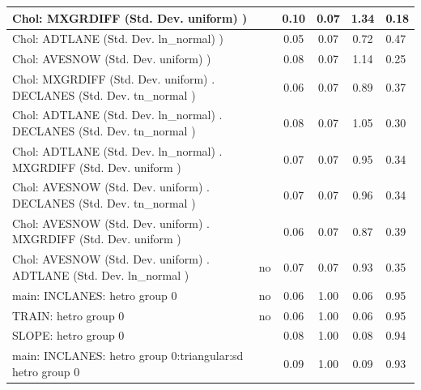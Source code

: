 \begin{table}
\begin{center}
\begin{tabular}{|l|l|c|c|c|l|}
			\hline
			 Chol: MXGRDIFF (Std. Dev. uniform) ) &  & 0.10 & 0.07 & 1.34 & 0.18 \\
			\hline
			 Chol: ADTLANE (Std. Dev. ln_normal) ) &  & 0.05 & 0.07 & 0.72 & 0.47 \\
			\hline
			 Chol: AVESNOW (Std. Dev. uniform) ) &  & 0.08 & 0.07 & 1.14 & 0.25 \\
			\hline
			 Chol: MXGRDIFF (Std. Dev. uniform) . DECLANES (Std. Dev.   tn_normal ) &  & 0.06 & 0.07 & 0.89 & 0.37 \\
			\hline
			 Chol: ADTLANE (Std. Dev. ln_normal) . DECLANES (Std. Dev.   tn_normal ) &  & 0.08 & 0.07 & 1.05 & 0.30 \\
			\hline
			 Chol: ADTLANE (Std. Dev. ln_normal) . MXGRDIFF (Std. Dev.   uniform ) &  & 0.07 & 0.07 & 0.95 & 0.34 \\
			\hline
			 Chol: AVESNOW (Std. Dev. uniform) . DECLANES (Std. Dev.   tn_normal ) &  & 0.07 & 0.07 & 0.96 & 0.34 \\
			\hline
			 Chol: AVESNOW (Std. Dev. uniform) . MXGRDIFF (Std. Dev.   uniform ) &  & 0.06 & 0.07 & 0.87 & 0.39 \\
			\hline
			 Chol: AVESNOW (Std. Dev. uniform) . ADTLANE (Std. Dev.   ln_normal ) & no & 0.07 & 0.07 & 0.93 & 0.35 \\
			\hline
			main: INCLANES: hetro group 0 & no & 0.06 & 1.00 & 0.06 & 0.95 \\
			\hline
			TRAIN: hetro group 0 & no & 0.06 & 1.00 & 0.06 & 0.95 \\
			\hline
			SLOPE: hetro group 0 &  & 0.08 & 1.00 & 0.08 & 0.94 \\
			\hline
			main: INCLANES: hetro group 0:triangular:sd  hetro group 0 &  & 0.09 & 1.00 & 0.09 & 0.93 \\
			\hline
		\end{tabular}
	\end{center}
\end{table}